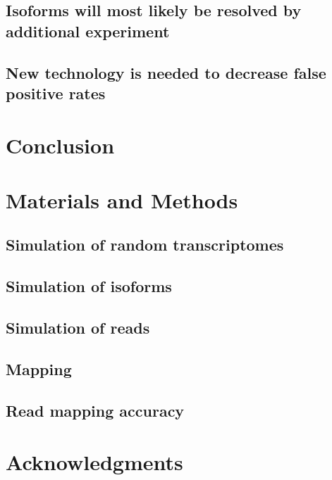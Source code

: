 \documentclass[10pt]{article}
\begin{document}
\subsection*{Isoforms will most likely be resolved by additional experiment}

\subsection*{New technology is needed to decrease false positive rates}

\section*{Conclusion}

\section*{Materials and Methods}

\subsection*{Simulation of random transcriptomes}

\subsection*{Simulation of isoforms}

\subsection*{Simulation of reads}

\subsection*{Mapping}

\subsection*{Read mapping accuracy}


\section*{Acknowledgments}
\end{document}
